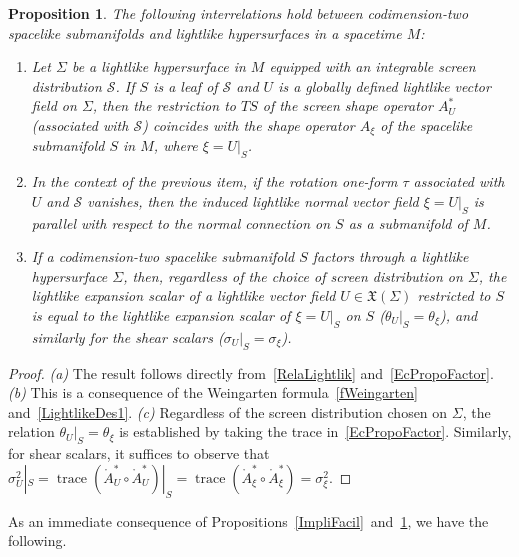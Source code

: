 \documentclass[11pt]{article}
\numberwithin{equation}{section}
\newtheorem{proposition}[theorem]{Proposition}
\begin{document}
	
\begin{proposition} \label{proposition:InterrelationSubmanifoldsHypersurfaces}
	The following interrelations hold between codimension-two spacelike submanifolds and lightlike hypersurfaces in a spacetime $M$:
	\begin{enumerate}
		\item[(a)] Let $\Sigma$ be a lightlike hypersurface in $M$ equipped with an integrable screen distribution $\mathcal{S}$. If $S$ is a leaf of $\mathcal{S}$ and $U$ is a globally defined lightlike vector field on $\Sigma$, then the restriction to $TS$ of the screen shape operator $A^*_U$ (associated with $\mathcal{S}$) coincides with the shape operator $A_{\xi}$ of the spacelike submanifold $S$ in $M$, where $\xi = U|_S$.
		\item[(b)] In the context of the previous item, if the rotation one-form $\tau$ associated with $U$ and ${\mathcal S}$ vanishes, then the induced lightlike normal vector field $\xi = U|_S$ is parallel with respect to the normal connection on $S$ as a submanifold of $M$.
		\item[(c)] If a codimension-two spacelike submanifold $S$ factors through a lightlike hypersurface $\Sigma$, then, regardless of the choice of screen distribution on $\Sigma$, the lightlike expansion scalar of a lightlike vector field $U \in \mathfrak{X}(\Sigma)$ restricted to $S$ is equal to the lightlike expansion scalar of $\xi = U|_S$ on $S$ ($\theta_U|_S = \theta_\xi$), and similarly for the shear scalars ($\sigma_U|_S = \sigma_\xi$).
	\end{enumerate}
\end{proposition}
	\begin{proof}
		\emph{(a)} The result follows directly from~\eqref{RelaLightlik} and~\eqref{EcPropoFactor}. \emph{(b)} This is a consequence of the Weingarten formula~\eqref{fWeingarten} and~\eqref{LightlikeDes1}. 
		\emph{(c)} Regardless of the screen distribution chosen on $\Sigma$, the relation $\theta_U|_S = \theta_\xi$ is established by taking the trace in~\eqref{EcPropoFactor}. Similarly, for shear scalars, it suffices to observe that~$\sigma_U^2|_S = \operatorname{trace}(\mathring{A}^*_U \circ \mathring{A}^*_U)|_S= \operatorname{trace}(\mathring{A}^*_\xi \circ \mathring{A}^*_\xi)=\sigma^2_\xi.$
	\end{proof}
	

	As an immediate consequence of Propositions~\ref{ImpliFacil}~and~\ref{proposition:InterrelationSubmanifoldsHypersurfaces}, we have the following.
	
\end{document}
